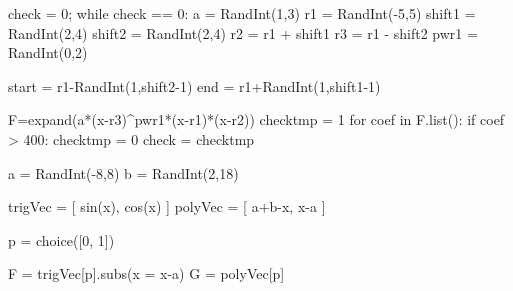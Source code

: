 \begin{sagesilent}
check = 0;
while check == 0:
    a = RandInt(1,3)
    r1 = RandInt(-5,5)
    shift1 = RandInt(2,4)
    shift2 = RandInt(2,4)
    r2 = r1 + shift1
    r3 = r1 - shift2
    pwr1 = RandInt(0,2)
    
    start = r1-RandInt(1,shift2-1)
    end = r1+RandInt(1,shift1-1)
    
    F=expand(a*(x-r3)^pwr1*(x-r1)*(x-r2))
    checktmp = 1
    for coef in F.list():
        if coef  > 400:
            checktmp = 0
    check = checktmp
        
\end{sagesilent}


\begin{sagesilent}
a = RandInt(-8,8)
b = RandInt(2,18)

trigVec = [
   sin(x), 
   cos(x)
]
polyVec = [
   a+b-x, 
   x-a
]

p = choice([0, 1])

F = trigVec[p].subs(x = x-a)
G = polyVec[p]
\end{sagesilent}

